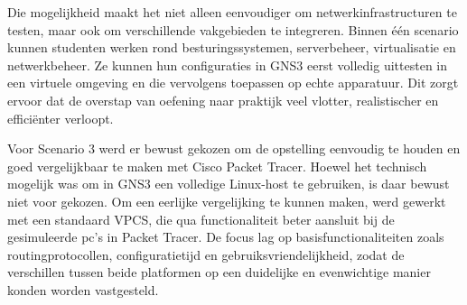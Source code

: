\vspace{0.3cm}

Die mogelijkheid maakt het niet alleen eenvoudiger om netwerkinfrastructuren te testen, maar ook om verschillende vakgebieden te integreren. Binnen één scenario kunnen studenten werken rond besturingssystemen, serverbeheer, virtualisatie en netwerkbeheer. Ze kunnen hun configuraties in GNS3 eerst volledig uittesten in een virtuele omgeving en die vervolgens toepassen op echte apparatuur. Dit zorgt ervoor dat de overstap van oefening naar praktijk veel vlotter, realistischer en efficiënter verloopt.

\vspace{0.3cm}

Voor Scenario 3 werd er bewust gekozen om de opstelling eenvoudig te houden en goed vergelijkbaar te maken met Cisco Packet Tracer. Hoewel het technisch mogelijk was om in GNS3 een volledige Linux-host te gebruiken, is daar bewust niet voor gekozen. Om een eerlijke vergelijking te kunnen maken, werd gewerkt met een standaard VPCS, die qua functionaliteit beter aansluit bij de gesimuleerde pc’s in Packet Tracer. De focus lag op basisfunctionaliteiten zoals routingprotocollen, configuratietijd en gebruiksvriendelijkheid, zodat de verschillen tussen beide platformen op een duidelijke en evenwichtige manier konden worden vastgesteld.

